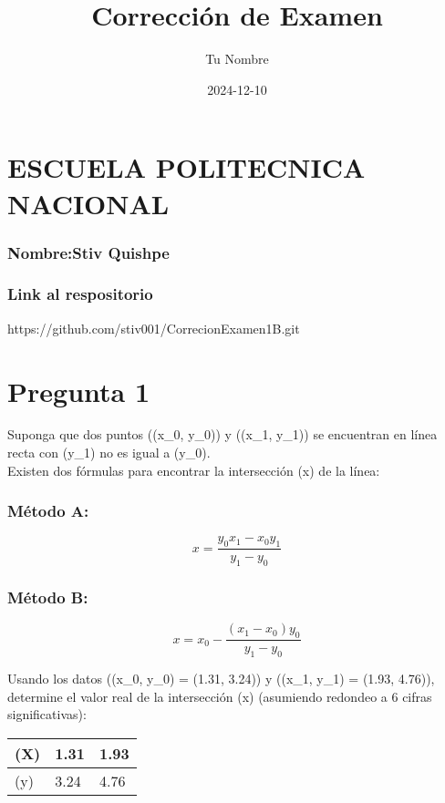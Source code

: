 \documentclass[
  letterpaper,
  DIV=11,
  numbers=noendperiod]{scrartcl}
\title{Corrección de Examen}
\author{Tu Nombre}
\date{2024-12-10}
\begin{document}
\maketitle


\section{\texorpdfstring{\textbf{ESCUELA POLITECNICA
NACIONAL}}{ESCUELA POLITECNICA NACIONAL}}\label{escuela-politecnica-nacional}

\subsubsection{Nombre:Stiv Quishpe}\label{nombrestiv-quishpe}

\subsubsection{Link al respositorio}\label{link-al-respositorio}

https://github.com/stiv001/CorrecionExamen1B.git

\section{Pregunta 1}\label{pregunta-1}

Suponga que dos puntos ((x\_0, y\_0)) y ((x\_1, y\_1)) se encuentran en
línea recta con (y\_1) no es igual a (y\_0).\\
Existen dos fórmulas para encontrar la intersección (x) de la línea:

\subsubsection{Método A:}\label{muxe9todo-a}

\[
x = \frac{y_0 x_1 - x_0 y_1}{y_1 - y_0}
\]

\subsubsection{Método B:}\label{muxe9todo-b}

\[
x = x_0 - \frac{(x_1 - x_0) y_0}{y_1 - y_0}
\]

Usando los datos ((x\_0, y\_0) = (1.31, 3.24)) y ((x\_1, y\_1) = (1.93,
4.76)), determine el valor real de la intersección (x) (asumiendo
redondeo a 6 cifras significativas):

\begin{longtable}[]{@{}lll@{}}
\toprule\noalign{}
(X) & 1.31 & 1.93 \\
\midrule\noalign{}
\endhead
\bottomrule\noalign{}
\endlastfoot
(y) & 3.24 & 4.76 \\
\end{longtable}
\end{document}
